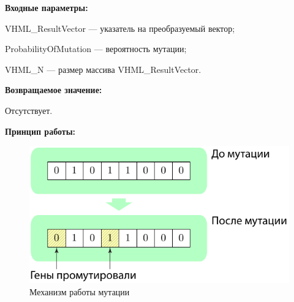 \textbf{Входные параметры:}

VHML\_ResultVector --- указатель на преобразуемый вектор;
 
ProbabilityOfMutation --- вероятность мутации;
 
VHML\_N --- размер массива VHML\_ResultVector.

\textbf{Возвращаемое значение:} 

Отсутствует.

\textbf{Принцип работы:}

\begin{figure} [h]
  \center
  \includegraphics [scale=0.8] {HML_MutationBinaryVector_Sheme}
  \caption{Механизм работы мутации} 
  \label{img:HML_MutationBinaryVector_Sheme}  
\end{figure}
